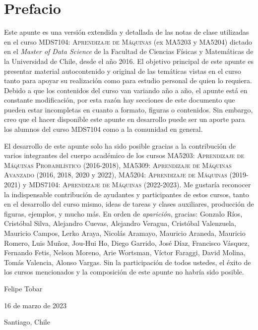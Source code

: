 \newpage
\section*{Prefacio}
Este apunte es una versión extendida y detallada de las notas de clase utilizadas en el curso \textsc{MDS7104: Aprendizaje de Máquinas} (ex MA5203 y MA5204) dictado en el \emph{Master of Data Science} de la Facultad de Ciencias Físicas y Matemáticas de la  Universidad de Chile, desde el año 2016. El objetivo principal de este apunte es presentar material autocontenido y original de las temáticas vistas en el curso tanto para apoyar su realización como para estudio personal de quien lo requiera. Debido a que los contenidos del curso van variando año a año, el apunte está en constante modificación, por esta razón hay secciones de este documento que pueden estar incompletas en cuanto a formato, figuras o contenidos. Sin embargo, creo que el hacer disponible este apunte en desarrollo puede ser un aporte para los alumnos del curso MDS7104 como a la comunidad en general.

El desarrollo de este apunte solo ha sido posible gracias a la contribución de varios integrantes del cuerpo académico de los cursos \textsc{MA5203: Aprendizaje de Máquinas Probabilístico} (2016-2018), \textsc{MA5309: Aprendizaje de Máquinas Avanzado} (2016, 2018, 2020 y 2022), \textsc{MA5204: Aprendizaje de Máquinas} (2019-2021) y \textsc{MDS7104: Aprendizaje de Máquinas} (2022-2023). Me gustaría reconocer la indispensable contribución de ayudantes y participantes de estos cursos, tanto en el desarrollo del curso mismo, ideas de tareas y clases auxiliares, producción de figuras, ejemplos, y mucho más. En orden de \emph{aparición}, gracias: 
Gonzalo Ríos, 
Cristóbal Silva, 
Alejandro Cuevas, 
Alejandro Veragua, 
Cristóbal Valenzuela, 
Mauricio Campos, 
Lerko Araya, 
Nicolás Aramayo, 
Mauricio Araneda, 
Mauricio Romero, 
Luis Muñoz, 
Jou-Hui Ho, 
Diego Garrido, 
José Díaz, 
Francisco Vásquez, 
Fernando Fetis, 
Nelson Moreno, 
Arie Wortsman, 
Víctor Faraggi, 
David Molina, 
Tomás Valencia, 
Alonso Vargas.
Sin la participación de todos ustedes, el éxito de los cursos mencionados y la composición de este apunte no habría sido posible.





\bigskip
\begin{flushright}
  Felipe Tobar\par
  16 de marzo de 2023\par
  Santiago, Chile
\end{flushright}
\newpage

